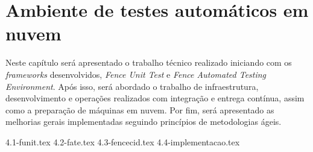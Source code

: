 \chapter{Ambiente de testes automáticos em nuvem}\label{cap_solucao}

Neste capítulo será apresentado o trabalho técnico realizado iniciando com os \emph{frameworks} desenvolvidos, \emph{Fence Unit Test} e \emph{Fence Automated Testing Environment}. Após isso, será abordado o trabalho de infraestrutura, desenvolvimento e operações realizados com integração e entrega contínua, assim como a preparação de máquinas em nuvem. Por fim, será apresentado as melhorias gerais implementadas seguindo princípios de metodologias ágeis.

{4.1-funit.tex}
{4.2-fate.tex}
{4.3-fencecid.tex}
{4.4-implementacao.tex}